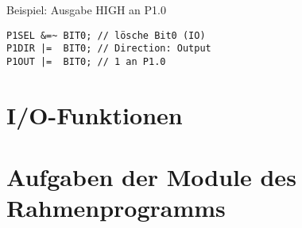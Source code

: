 \documentclass[a4paper, 12pt]{article}
\begin{document}
Beispiel: Ausgabe HIGH an P1.0
\vspace{\parskip}
\begin{lstlisting}
P1SEL &=~ BIT0; // lösche Bit0 (IO)
P1DIR |=  BIT0; // Direction: Output
P1OUT |=  BIT0; // 1 an P1.0
\end{lstlisting}


\section{I/O-Funktionen}

\section{Aufgaben der Module des Rahmenprogramms}

  
 
\end{document}
